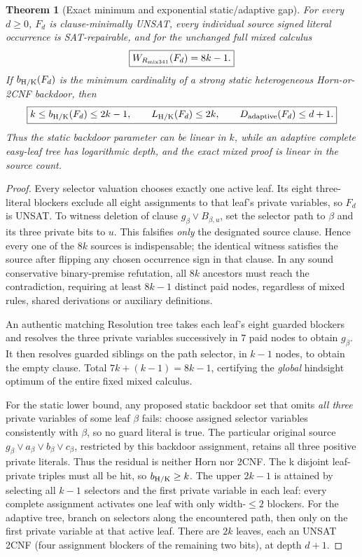\documentclass[11pt]{article}
\newtheorem{theorem}{Theorem}
\begin{document}
\begin{theorem}[Exact minimum and exponential static/adaptive gap]\label{gap}
For every \(d\ge0\), \(F_d\) is clause-minimally UNSAT, every individual source signed literal occurrence is SAT-repairable, and for the unchanged full mixed calculus
\[
\boxed{W_{R_{\rm mix341}}(F_d)=8k-1.}
\]
If \(b_{\rm H/K}(F_d)\) is the minimum cardinality of a \emph{strong static} heterogeneous Horn-or-2CNF backdoor, then
\[
\boxed{k\le b_{\rm H/K}(F_d)\le2k-1,\qquad
L_{\rm H/K}(F_d)\le 2k,\qquad D_{\rm adaptive}(F_d)\le d+1.}
\]
Thus the static backdoor parameter can be linear in \(k\), while an adaptive complete easy-leaf tree has logarithmic depth, and the exact mixed proof is linear in the source count.
\end{theorem}
\begin{proof}
Every selector valuation chooses exactly one active leaf. Its eight three-literal blockers exclude all eight assignments to that leaf's private variables, so \(F_d\) is UNSAT. To witness deletion of clause \(g_\beta\vee B_{\beta,u}\), set the selector path to \(\beta\) and its three private bits to \(u\). This falsifies \emph{only} the designated source clause. Hence every one of the \(8k\) sources is indispensable; the identical witness satisfies the source after flipping any chosen occurrence sign in that clause. In any sound conservative binary-premise refutation, all \(8k\) ancestors must reach the contradiction, requiring at least \(8k-1\) distinct paid nodes, regardless of mixed rules, shared derivations or auxiliary definitions.

An authentic matching Resolution tree takes each leaf's eight guarded blockers and resolves the three private variables successively in \(7\) paid nodes to obtain \(g_\beta\). It then resolves guarded siblings on the path selector, in \(k-1\) nodes, to obtain the empty clause. Total \(7k+(k-1)=8k-1\), certifying the \emph{global} hindsight optimum of the entire fixed mixed calculus.

For the static lower bound, any proposed static backdoor set that omits \emph{all three} private variables of some leaf \(\beta\) fails: choose assigned selector variables consistently with \(\beta\), so no guard literal is true. The particular original source \(g_\beta\vee a_\beta\vee b_\beta\vee c_\beta\), restricted by this backdoor assignment, retains all three positive private literals. Thus the residual is neither Horn nor 2CNF. The k disjoint leaf-private triples must all be hit, so \(b_{\rm H/K}\ge k\). The upper \(2k-1\) is attained by selecting all \(k-1\) selectors and the first private variable in each leaf: every complete assignment activates one leaf with only width-\(\le2\) blockers. For the adaptive tree, branch on selectors along the encountered path, then only on the first private variable at that active leaf. There are \(2k\) leaves, each an UNSAT 2CNF (four assignment blockers of the remaining two bits), at depth \(d+1\).
\end{proof}
\end{document}
